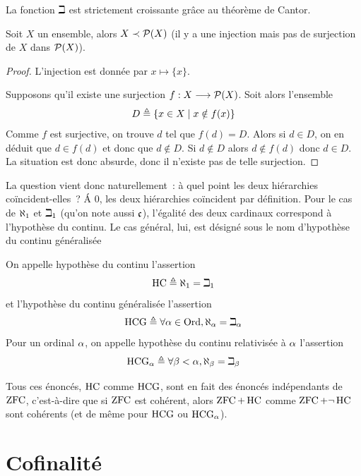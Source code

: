 \noindent
La fonction $\beth$ est strictement croissante grâce au théorème de Cantor.

\begin{theorem}\label{thm.Cantor}
  Soit $X$ un ensemble, alors $X \prec \mathcal{P}(X)$ (il y a une injection
  mais pas de surjection de $X$ dans $\mathcal{P}(X)$).
\end{theorem}

\begin{proof}
  L'injection est donnée par $x \mapsto \{x\}$.

  Supposons qu'il existe une surjection $f : \displaystyle X \longrightarrow \mathcal{P}(X)$. Soit
  alors l'ensemble
  \[D\triangleq \left\{ x\in X \;\middle\vert\; x\notin f(x) \right\}\]
  Comme $f$ est surjective, on trouve $d$ tel que $f(d) = D$. Alors si
  $d\in D$, on en déduit que $d\in f(d)$ et donc que $d\notin D$. Si
  $d\notin D$ alors $d\notin f(d)$ donc $d\in D$. La situation est donc absurde,
  donc il n'existe pas de telle surjection.
\end{proof}

La question vient donc naturellement~: à quel point les deux hiérarchies
coïncident-elles~? \'A $0$, les deux hiérarchies coïncident par définition.
Pour le cas de $\aleph_1$ et $\beth_1$ (qu'on note aussi $\mathfrak{c}$), l'égalité des
deux cardinaux correspond à l'hypothèse du continu. Le cas général, lui,
est désigné sous le nom d'hypothèse du continu généralisée

\begin{definition}
  On appelle hypothèse du continu l'assertion
  \[\operatorname{HC} \triangleq \aleph_1 = \beth_1\]
  et l'hypothèse du continu généralisée l'assertion
  \[\operatorname{HCG} \triangleq \forall \alpha \in \operatorname{Ord}, \aleph_\alpha = \beth_\alpha\]
  Pour un ordinal $\alpha$, on appelle hypothèse du continu relativisée à
  $\alpha$ l'assertion
  \[\operatorname{HCG}_\alpha \triangleq \forall \beta < \alpha, \aleph_{\beta} = \beth_{\beta}\]
\end{definition}

Tous ces énoncés, $\operatorname{HC}$ comme $\operatorname{HCG}$, sont en fait des énoncés
indépendants de $\operatorname{ZFC}$, c'est-à-dire que si $\operatorname{ZFC}$ est cohérent, alors
$\operatorname{ZFC} + \operatorname{HC}$ comme $\operatorname{ZFC} + \lnot\operatorname{HC}$ sont cohérents (et de même pour $\operatorname{HCG}$ ou
$\operatorname{HCG}_\alpha$).

\section{Cofinalité}\label{sct.cof}

